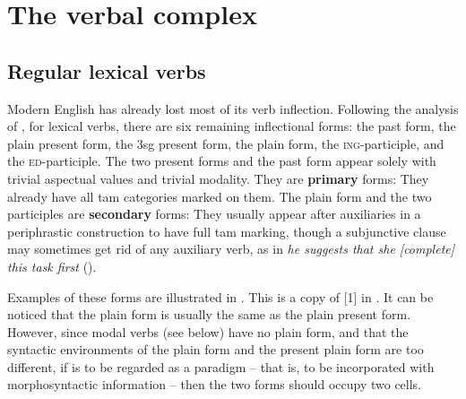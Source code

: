 \documentclass[UTF8, a4paper, oneside, scheme=plain, 12pt]{ctexbook}
\newcommand*{\citesec}[1]{\S~{#1}}
\newcommand*{\citechap}[1]{Ch.~{#1}}
\newcommand*{\citechapsec}[2]{\citechap{#1}.\citesec{#2}}
\newcommand*{\concept}[1]{\textbf{#1}}
\newcommand{\form}[1]{\emph{#1}}
\newcommand{\formcat}[1]{\textsc{#1}}
\begin{document}
\section{The verbal complex}\label{sec:verbal-complex}


\subsection{Regular lexical verbs}\label{sec:verb-forms}

Modern English has already lost most of its verb inflection.
Following the analysis of \citet[\citechapsec{3}{1.1}]{cgel},
for lexical verbs,
there are six remaining inflectional forms: 
the past form, the plain present form, 
the 3sg present form,
the plain form, the \formcat{ing}-participle,
and the \formcat{ed}-participle.
The two present forms and the past form appear solely 
with trivial aspectual values and trivial modality.
They are \concept{primary} forms:
They already have all \acs{tam} categories marked on them.
The plain form and the two participles are \concept{secondary} forms:
They usually appear after auxiliaries 
in a periphrastic construction to have full \acs{tam} marking,
though a subjunctive clause may sometimes get rid of any auxiliary verb,
as in \form{he suggests that she [complete] this task first} ().

Examples of these forms are illustrated in . 
This is a copy of [1] in \citet[\citesec{1.1}]{cgel}.
It can be noticed that the plain form is usually the same as the plain present form.
However, since modal verbs (see below) have no plain form,
and that the syntactic environments of the plain form and the present plain form are too different,
if  is to be regarded as a paradigm
-- that is, to be incorporated with morphosyntactic information -- 
then the two forms should occupy two cells.
\end{document}
